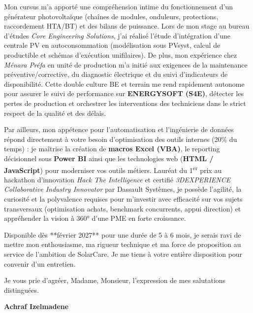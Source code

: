 \documentclass[10pt,a4paper]{altacv}
\begin{document}
\vspace{6pt}

Mon cursus m'a apporté une compréhension intime du fonctionnement d'un générateur photovoltaïque (chaînes de modules, onduleurs, protections, raccordement HTA/BT) et des bilans de puissance. Lors de mon stage au bureau d'études \textit{Core Engineering Solutions}, j'ai réalisé l'étude d'intégration d'une centrale PV en autoconsommation (modélisation sous PVsyst, calcul de productible et schémas d'exécution unifilaires). De plus, mon expérience chez \textit{Ménara Préfa} en unité de production m'a initié aux exigences de la maintenance préventive/corrective, du diagnostic électrique et du suivi d'indicateurs de disponibilité. Cette double culture BE et terrain me rend rapidement autonome pour assurer le suivi de performance sur \textbf{ENERGYSOFT (S4E)}, détecter les pertes de production et orchestrer les interventions des techniciens dans le strict respect de la qualité et des délais.

\vspace{6pt}

Par ailleurs, mon appétence pour l'automatisation et l'ingénierie de données répond directement à votre besoin d'optimisation des outils internes (20\% du temps) : je maîtrise la création de \textbf{macros Excel (VBA)}, le reporting décisionnel sous \textbf{Power BI} ainsi que les technologies web (\textbf{HTML / JavaScript}) pour moderniser vos outils métiers. Lauréat du 1\textsuperscript{er} prix au hackathon d'innovation \textit{Hack The Intelligence} et certifié \textit{3DEXPERIENCE Collaborative Industry Innovator} par Dassault Systèmes, je possède l'agilité, la curiosité et la polyvalence requises pour m'investir avec efficacité sur vos sujets transversaux (optimisation achats, benchmark concurrents, appui direction) et appréhender la vision à 360° d'une PME en forte croissance.

\vspace{6pt}

Disponible dès **février 2027** pour une durée de 5 à 6 mois, je serais ravi de mettre mon enthousiasme, ma rigueur technique et ma force de proposition au service de l'ambition de SolarCare. Je me tiens à votre entière disposition pour convenir d'un entretien.

\vspace{6pt}

Je vous prie d'agréer, Madame, Monsieur, l'expression de mes salutations distinguées.

\vspace{14pt}

\begin{flushright}
  \large\color{emphasis}\textbf{Achraf Izelmadene}
\end{flushright}
\end{document}
